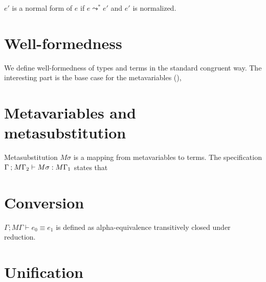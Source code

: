 \documentclass[acmsmall,natbib=false,review,anonymous]{acmart}
\begin{document}
\begin{definition}
  $e'$ is a normal form of $e$ if
  $e  \leadsto^*  e'$ and $e'$ is normalized.
\end{definition}

\ottdefnRedNeutLabeled{}

\section{Well-formedness}

We define well-formedness of types and terms
in the standard congruent way.
The interesting part is the base case for the metavariables
(),

  \begin{ottdefnblock}[]{\ottdefnHeaderWfWF}{}
    \ottusedrule{\ottdruleWfWFVarLabeled[]{}}
    \ottusedrule{\ottdruleWfWFPLamLabeled[]{}}
    \ottusedrule{\ottdruleWfWFAVarLabeled[]{}}
  \end{ottdefnblock}


\section{Metavariables and metasubstitution}

\begin{definition}
  Metasubstitution $M\sigma$
  is a mapping from metavariables to terms.
  The  specification 
  $\Gamma  \mathbin{;}  M\Gamma_{{\mathrm{2}}}  \vdash  M\sigma  :  M\Gamma_{{\mathrm{1}}}$ states that
\end{definition}


\section{Conversion}

\begin{definition}
 $\Gamma  \mathbin{;}  M\Gamma  \vdash  e_{{\mathrm{0}}}  \equiv  e_{{\mathrm{1}}}$
 is defined as alpha-equivalence 
 transitively closed under reduction. 
\end{definition}



\section{Unification}
\end{document}
